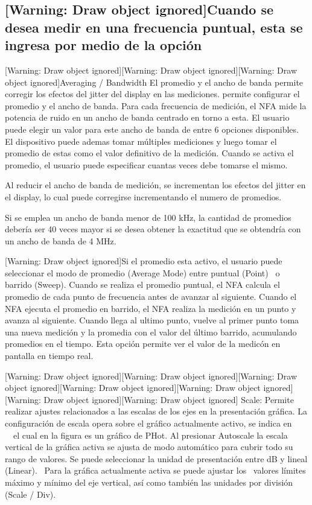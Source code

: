 \documentclass[paper=letter,oneside,fontsize=10pt,parskip=full]{article}
\begin{document}
\subsection[Cuando se desea medir en una frecuencia puntual, esta se ingresa por medio de la opción ]{[Warning: Draw
object ignored]Cuando se desea medir en una frecuencia puntual, esta se ingresa por medio de la opción }
[Warning: Draw object ignored][Warning: Draw object ignored][Warning: Draw object ignored]Averaging / Bandwidth El
promedio y el ancho de banda permite corregir los efectos del jitter del display en las mediciones. permite configurar
el promedio y el ancho de banda. Para cada frecuencia de medición, el NFA mide la potencia de ruido en un ancho de
banda centrado en torno a esta. El usuario puede elegir un valor para este ancho de banda de entre 6 opciones
disponibles. El dispositivo puede ademas tomar múltiples mediciones y luego tomar el promedio de estas como el valor
definitivo de la medición. Cuando se activa el promedio, el usuario puede especificar cuantas veces debe tomarse el
mismo.

Al reducir el ancho de banda de medición, se incrementan los efectos del jitter en el display, lo cual puede corregirse
incrementando el numero de promedios.

Si se emplea un ancho de banda menor de 100 kHz, la cantidad de promedios debería ser 40 veces mayor si se desea obtener
la exactitud que se obtendría con un ancho de banda de 4 MHz.

[Warning: Draw object ignored]Si el promedio esta activo, el usuario puede seleccionar el modo de promedio (Average
Mode) entre puntual (Point) \ o barrido (Sweep). Cuando se realiza el promedio puntual, el NFA calcula el promedio de
cada punto de frecuencia antes de avanzar al siguiente. Cuando el NFA ejecuta el promedio en barrido, el NFA realiza la
medición en un punto y avanza al siguiente. Cuando llega al ultimo punto, vuelve al primer punto toma una nueva
medición y la promedia con el valor del último barrido, acumulando promedios en el tiempo. Esta opción permite ver el
valor de la medicón en pantalla en tiempo real.

[Warning: Draw object ignored][Warning: Draw object ignored][Warning: Draw object ignored][Warning: Draw object
ignored][Warning: Draw object ignored][Warning: Draw object ignored][Warning: Draw object ignored] Scale: Permite
realizar ajustes relacionados a las escalas de los ejes en la presentación gráfica. La configuración de escala opera
sobre el gráfico actualmente activo, se indica en \ \ el cual en la figura es un gráfico de PHot. Al presionar
Autoscale la escala vertical de la gráfica activa se ajusta de modo automático para cubrir todo su rango de valores. Se
puede seleccionar la unidad de presentación entre dB y lineal (Linear). \ Para la gráfica actualmente activa se puede
ajustar los \ valores límites máximo y mínimo del eje vertical, así como también las unidades por división (Scale /
Div).
\end{document}
